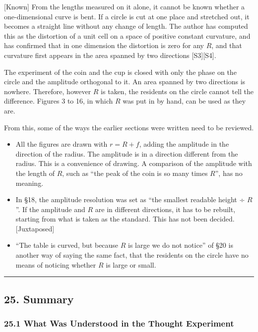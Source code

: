 \documentclass[
  a4paper,
]{article}
\providecommand{\tightlist}{%
  \setlength{\itemsep}{0pt}\setlength{\parskip}{0pt}}
\begin{document}
{[}Known{]} From the lengths measured on it alone, it cannot be known
whether a one-dimensional curve is bent. If a circle is cut at one place
and stretched out, it becomes a straight line without any change of
length. The author has computed this as the distortion of a unit cell on
a space of positive constant curvature, and has confirmed that in one
dimension the distortion is zero for any \(R\), and that curvature first
appears in the area spanned by two directions {[}S3{]}{[}S4{]}.

The experiment of the coin and the cup is closed with only the phase on
the circle and the amplitude orthogonal to it. An area spanned by two
directions is nowhere. Therefore, however \(R\) is taken, the residents
on the circle cannot tell the difference. Figures 3 to 16, in which
\(R\) was put in by hand, can be used as they are.

From this, some of the ways the earlier sections were written need to be
reviewed.

\begin{itemize}
\tightlist
\item
  All the figures are drawn with \(r=R+f\), adding the amplitude in the
  direction of the radius. The amplitude is in a direction different
  from the radius. This is a convenience of drawing. A comparison of the
  amplitude with the length of \(R\), such as ``the peak of the coin is
  so many times \(R\)'', has no meaning.
\item
  In §18, the amplitude resolution was set as ``the smallest readable
  height ÷ \(R\)''. If the amplitude and \(R\) are in different
  directions, it has to be rebuilt, starting from what is taken as the
  standard. This has not been decided. {[}Juxtaposed{]}
\item
  ``The table is curved, but because \(R\) is large we do not notice''
  of §20 is another way of saying the same fact, that the residents on
  the circle have no means of noticing whether \(R\) is large or small.
\end{itemize}

\begin{center}\rule{0.5\linewidth}{0.5pt}\end{center}

\subsection{25. Summary}\label{summary}

\subsubsection{25.1 What Was Understood in the Thought
Experiment}\label{what-was-understood-in-the-thought-experiment}
\end{document}
